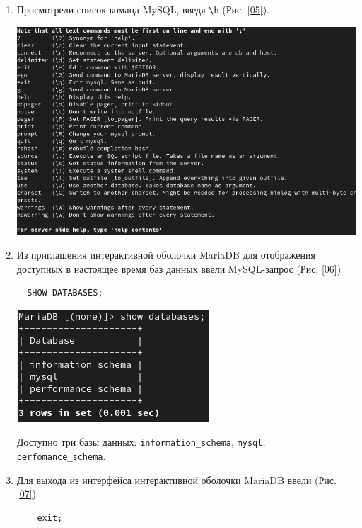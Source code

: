 \begin{enumerate}
\item Просмотрели список команд MySQL, введя \texttt{\textbackslash h} (Рис. \ref{05}).

\begin{center}
    \centering
    \includegraphics[width=\textwidth]{../images/image05.png}
    \label{05}
\end{center}

\item Из приглашения интерактивной оболочки MariaDB для отображения доступных в настоящее время баз данных ввели MySQL-запрос (Рис. \ref{06})
\begin{verbatim}
  SHOW DATABASES;
\end{verbatim}

\begin{center}
    \centering
    \includegraphics[width=\textwidth]{../images/image06.png}
    \label{06}
\end{center}

Доступно три базы данных: \texttt{information\_schema}, \texttt{mysql}, \texttt{perfomance\_schema}.

\item Для выхода из интерфейса интерактивной оболочки MariaDB ввели (Рис. \ref{07})
  \begin{verbatim}
    exit;
  \end{verbatim}
\end{enumerate}

